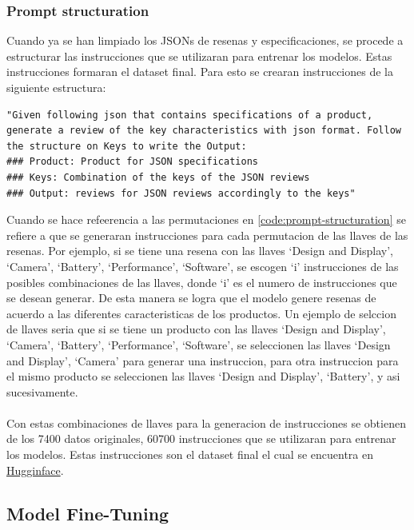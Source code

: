 \subsubsection{Prompt structuration}
Cuando ya se han limpiado los JSONs de resenas y especificaciones, se procede a estructurar las instrucciones que se utilizaran para entrenar los modelos. Estas instrucciones formaran el dataset final. Para esto se crearan instrucciones de la siguiente estructura:
\begin{lstlisting}[style=textstyle, frame = single, caption=Prompt structuration, label=code:prompt-structuration]
"Given following json that contains specifications of a product, generate a review of the key characteristics with json format. Follow the structure on Keys to write the Output: 
### Product: Product for JSON specifications
### Keys: Combination of the keys of the JSON reviews
### Output: reviews for JSON reviews accordingly to the keys"
\end{lstlisting}
Cuando se hace refeerencia a las permutaciones en \ref{code:prompt-structuration} se refiere a que se generaran instrucciones para cada permutacion de las llaves de las resenas. Por ejemplo, si se tiene una resena con las llaves `Design and Display', `Camera', `Battery', `Performance', `Software', se escogen `i' instrucciones de las posibles combinaciones de las llaves, donde `i' es el numero de instrucciones que se desean generar. De esta manera se logra que el modelo genere resenas de acuerdo a las diferentes caracteristicas de los productos. Un ejemplo de selccion de llaves seria que si se tiene un producto con las llaves `Design and Display', `Camera', `Battery', `Performance', `Software', se seleccionen las llaves `Design and Display', `Camera' para generar una instruccion, para otra instruccion para el mismo producto se seleccionen las llaves `Design and Display', `Battery', y asi sucesivamente.
\\\\
Con estas combinaciones de llaves para la generacion de instrucciones se obtienen de los 7400 datos originales, 60700 instrucciones que se utilizaran para entrenar los modelos. Estas instrucciones son el dataset final el cual se encuentra en \href{https://huggingface.co/datasets/kokujin/json_data_luis}{Hugginface}.

\subsection{Model Fine-Tuning}
